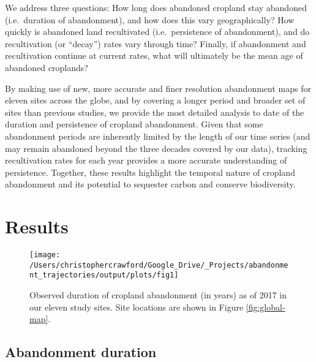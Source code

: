 \documentclass[9pt,twocolumn,twoside,lineno]{pnas-new}
\begin{document}
We address three questions: How long does abandoned cropland stay abandoned (i.e.~duration of abandonment), and how does this vary geographically?
How quickly is abandoned land recultivated (i.e.~persistence of abandonment), and do recultivation (or ``decay'') rates vary through time?
Finally, if abandonment and recultivation continue at current rates, what will ultimately be the mean age of abandoned croplands?

By making use of new, more accurate and finer resolution abandonment maps for eleven sites across the globe, and by covering a longer period and broader set of sites than previous studies, we provide the most detailed analysis to date of the duration and persistence of cropland abandonment.
Given that some abandonment periods are inherently limited by the length of our time series (and may remain abandoned beyond the three decades covered by our data), tracking recultivation rates for each year provides a more accurate understanding of persistence.
Together, these results highlight the temporal nature of cropland abandonment and its potential to sequester carbon and conserve biodiversity.

\hypertarget{results}{%
\section{Results}\label{results}}



\begin{figure*}
\texttt{[image: /Users/christophercrawford/Google\_Drive/\_Projects/abandonment\_trajectories/output/plots/fig1]} \caption{Observed duration of cropland abandonment (in years) as of 2017 in our eleven study sites. Site locations are shown in Figure \ref{fig:global-map}.}\label{fig:maps-abn-duration}
\end{figure*}

\hypertarget{abandonment-duration}{%
\subsection{Abandonment duration}\label{abandonment-duration}}
\end{document}
